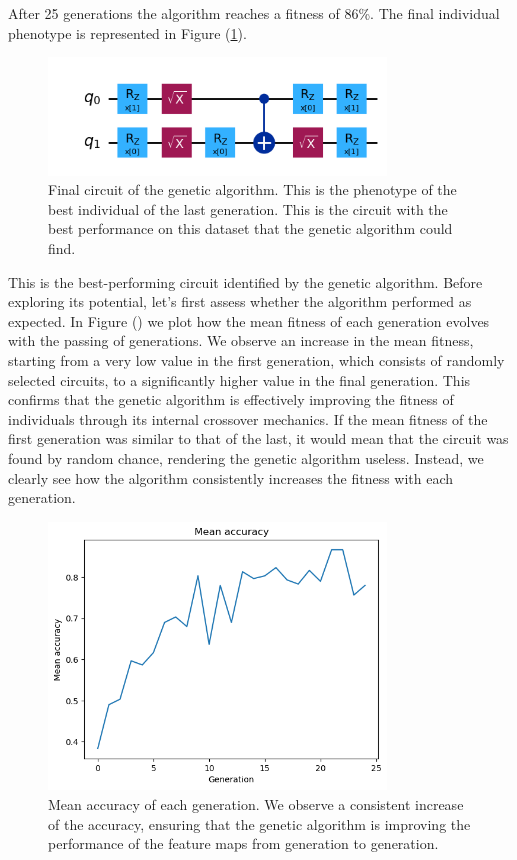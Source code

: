 \documentclass[12pt]{article}
\begin{document}
After 25 generations the algorithm reaches a fitness of 86\%. The final individual phenotype is represented in Figure (\ref{fig:final circuit}).
\begin{figure}[h!]
    \centering
    \includegraphics[width=0.8\textwidth]{images/finalcircuit.png}
    \caption{Final circuit of the genetic algorithm. This is the phenotype of the best individual of the last generation. This is the circuit with the best performance on this dataset that the genetic algorithm could find.}
    \label{fig:final circuit}
\end{figure}
This is the best-performing circuit identified by the genetic algorithm. Before exploring its potential, let's first assess whether the algorithm performed as expected. In Figure () we plot how the mean fitness of each generation evolves with the passing of generations. We observe an increase in the mean fitness, starting from a very low value in the first generation, which consists of randomly selected circuits, to a significantly higher value in the final generation. This confirms that the genetic algorithm is effectively improving the fitness of individuals through its internal crossover mechanics. If the mean fitness of the first generation was similar to that of the last, it would mean that the circuit was found by random chance, rendering the genetic algorithm useless. Instead, we clearly see how the algorithm consistently increases the fitness with each generation.
\begin{figure}[h!]
    \centering
    \includegraphics[width=0.8\textwidth]{images/meanaccuracy.png}
    \caption{Mean accuracy of each generation. We observe a consistent increase of the accuracy, ensuring that the genetic algorithm is improving the performance of the feature maps from generation to generation.}
    \label{fig:mean accuracy}
\end{figure}
\end{document}
